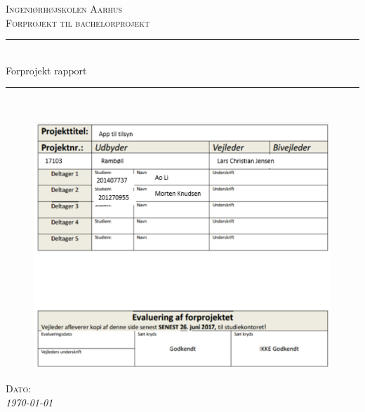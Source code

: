 \thispagestyle{empty}
\newcommand{\HRule}{\rule{\linewidth}{0.1mm}} %

\begin{center}
	\vspace{3cm}
	\textsc{\LARGE Ingeniørhøjskolen Aarhus}\\[1.5cm] %
	
	\textsc{\large Forprojekt til bachelorprojekt}\\[2.5cm] 
	
	\HRule \\[0.8cm]

	{\LARGE Forprojekt rapport} \\[0.5cm]
	\HRule \\[1.5cm]
	
	\begin{figure}[h!]
		\centering
		\includegraphics[width=0.9\linewidth]{Forside/ForsideTabel}
	\end{figure}
	


	\textsc{\large Dato: }\\
	{\large\textit{\today}} \\[3cm]
	\vfill %
	
\end{center} %

\clearpage

\newpage